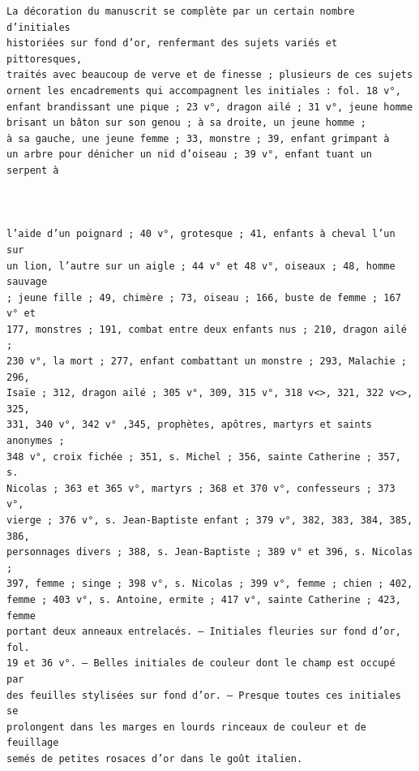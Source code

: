 \documentclass[a4paper,12pt,twoside]{book}
\begin{document}
\begin{verbatim}
La décoration du manuscrit se complète par un certain nombre d’initiales
historiées sur fond d’or, renfermant des sujets variés et pittoresques, 
traités avec beaucoup de verve et de finesse ; plusieurs de ces sujets 
ornent les encadrements qui accompagnent les initiales : fol. 18 v°, 
enfant brandissant une pique ; 23 v°, dragon ailé ; 31 v°, jeune homme
brisant un bâton sur son genou ; à sa droite, un jeune homme ; 
à sa gauche, une jeune femme ; 33, monstre ; 39, enfant grimpant à 
un arbre pour dénicher un nid d’oiseau ; 39 v°, enfant tuant un serpent à



l’aide d’un poignard ; 40 v°, grotesque ; 41, enfants à cheval l’un sur 
un lion, l’autre sur un aigle ; 44 v° et 48 v°, oiseaux ; 48, homme sauvage 
; jeune fille ; 49, chimère ; 73, oiseau ; 166, buste de femme ; 167 v° et
177, monstres ; 191, combat entre deux enfants nus ; 210, dragon ailé ; 
230 v°, la mort ; 277, enfant combattant un monstre ; 293, Malachie ; 296, 
Isaïe ; 312, dragon ailé ; 305 v°, 309, 315 v°, 318 v<>, 321, 322 v<>, 325,
331, 340 v°, 342 v° ,345, prophètes, apôtres, martyrs et saints anonymes ;
348 v°, croix fichée ; 351, s. Michel ; 356, sainte Catherine ; 357, s. 
Nicolas ; 363 et 365 v°, martyrs ; 368 et 370 v°, confesseurs ; 373 v°,
vierge ; 376 v°, s. Jean-Baptiste enfant ; 379 v°, 382, 383, 384, 385, 386,
personnages divers ; 388, s. Jean-Baptiste ; 389 v° et 396, s. Nicolas ; 
397, femme ; singe ; 398 v°, s. Nicolas ; 399 v°, femme ; chien ; 402,
femme ; 403 v°, s. Antoine, ermite ; 417 v°, sainte Catherine ; 423, femme
portant deux anneaux entrelacés. — Initiales fleuries sur fond d’or, fol. 
19 et 36 v°. — Belles initiales de couleur dont le champ est occupé par 
des feuilles stylisées sur fond d’or. — Presque toutes ces initiales se 
prolongent dans les marges en lourds rinceaux de couleur et de feuillage
semés de petites rosaces d’or dans le goût italien.


\end{verbatim}
\end{document}
